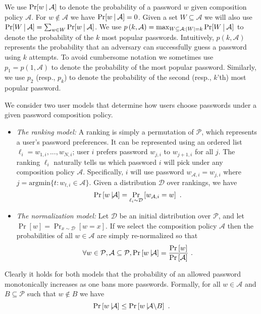 \documentclass[prodmode,acmec]{ec-acmsmall}
\newcommand{\PasswordSpace}{\mathcal{P}}
\begin{document}
We use $\Pr[w~\vline ~\mathcal{A}]$ to denote the probability of a password $w$ given composition policy $\mathcal{A}$. For $w \notin \mathcal{A}$ we have $\Pr[w~\vline ~\mathcal{A}]=0$. Given a set $W \subseteq \mathcal{A}$ we will also use $\Pr[W~\vline~ \mathcal{A}] = \sum_{w \in W} \Pr[w~\vline~ \mathcal{A}]$. We use $p\left(k,\mathcal{A} \right) = \max_{W \subseteq \mathcal{A}: \left|W\right|=k} \Pr[W ~\vline ~\mathcal{A}]$ to denote the probability of the $k$ most popular passwords. Intuitively, $p\left(k,\mathcal{A} \right)$ represents the probability that an adversary can successfully guess a password using $k$ attempts. To avoid cumbersome notation we sometimes use $p_1 = p\left(1,\mathcal{A}\right)$ to denote the probability of the most popular password.  Similarly, we use $p_2$ (resp., $p_k$) to denote the probability of the second (resp., $k$'th) most popular password.



We consider two user models that determine how users choose passwords under a given password composition policy. 

\begin{itemize}
\item \emph{The ranking model:} A ranking is simply a permutation of $\PasswordSpace$, which represents a user's password preferences. It can be represented using an ordered list $\ell_i = w_{1,i},...,w_{N,i}$; user $i$ prefers password $w_{j,i}$ to $w_{j+1,i}$ for all $j$. The ranking $\ell_i$ naturally tells us which password $i$ will pick under any composition policy $\mathcal{A}$. Specifically, $i$ will use password $w_{\mathcal{A},i} = w_{j,i}$ where  $j = \text{argmin}\{t : w_{t,i} \in \mathcal{A}\}$. Given a distribution $\mathcal{D}$ over rankings, we have 
\[\Pr\left[w~\vline \mathcal{A}\right] = \Pr_{\ell_i\sim \mathcal{D}}\left[w_{\mathcal{A},i} = w\right]  \ .\] 

\item\emph{The normalization model:} 
Let $\mathcal{D}$ be an initial distribution over $\PasswordSpace$, and let $\Pr\left[w \right] = \Pr_{x \sim \mathcal{D}}\left[w = x\right]$. If we select the composition policy $\mathcal{A}$ then the probabilities of all $w \in \mathcal{A}$ are simply re-normalized so that
\[\forall w \in \mathcal{P}, \mathcal{A} \subseteq \mathcal{P}, \Pr\left[w~\vline\mathcal{A} \right] = \frac{\Pr\left[w \right]}{\Pr\left[\mathcal{A}\right]}  \ .\]
\end{itemize}

Clearly it holds for both models that the probability of an allowed password monotonically increases as one bans more passwords. Formally, for all $w \in \mathcal{A}$ and $B \subseteq \mathcal{P}$ such that $w \notin B$ we have
\begin{equation} 
\label{claim:banningNecessaryClaim}
\Pr\left[ w ~ \vline \mathcal{A}\right]  \leq  \Pr\left[ w ~ \vline \mathcal{A} \backslash B \right]  \ . 
\end{equation}
\end{document}
